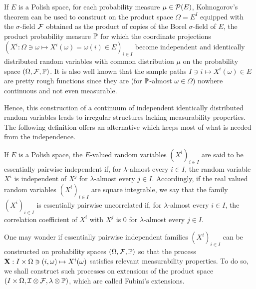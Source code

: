 If $E$ is a Polish space, for each probability measure $\mu\in{\cal P}(E)$, Kolmogorov's theorem can be used to construct on the product space $\Omega=E^I$ equipped with the $\sigma$-field ${\cal F}$ obtained as the  product of copies of the Borel $\sigma$-field of $E$, the product probability measure $\mathbb{P}$ for which the coordinate projections $(X^i:\Omega\ni\omega\mapsto X^i(\omega)=\omega(i)\in E)_{i \in I}$ become independent and identically distributed random variables with common distribution $\mu$ on the probability space $(\Omega,{\cal F},\mathbb{P})$. It is also well known that the sample paths $I \ni i\mapsto X^i(\omega) \in E$ are pretty rough functions since they are (for $\mathbb{P}$-almost $\omega\in\Omega$) nowhere continuous and not even measurable.

Hence, this construction of a continuum of independent identically distributed random variables leads to irregular structures lacking measurability properties. The following definition offers an alternative which keeps most of what is needed from the independence. 

\begin{definition}
	\label{de:essentially_iid}
	If $E$ is a Polish space, the $E$-valued random variables $(X^i)_{i\in I}$ are said to be essentially pairwise independent if, for $\lambda$-almost every $i\in I$, the random variable $X^i$ is independent of $X^j$ for $\lambda$-almost every $j\in I$. Accordingly, if the real valued random variables $(X^i)_{i \in I}$ are square integrable, we say that the family $(X^i)_{i\in I}$ is essentially pairwise uncorrelated if, for $\lambda$-almost every $i\in I$, the correlation coefficient of $X^i$ with $X^j$ is $0$ for $\lambda$-almost every $j\in I$.
\end{definition}

One may wonder if  essentially pairwise independent families $(X^i)_{i\in I}$ can be constructed on probability spaces $(\Omega,{\cal F},\mathbb{P})$ so that the process $\mathbf{X}:I\times\Omega\ni(i,\omega)\mapsto X^i(\omega)$ 
satisfies relevant measurability properties. 
To do so, we shall construct such processes on extensions of the product space $(I\times \Omega,{\cal I}\otimes{\cal F},\lambda\otimes\mathbb{P})$, which are called Fubini's extensions. 

